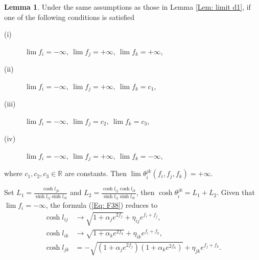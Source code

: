 \documentclass[12pt]{amsart}
\theoremstyle{definition}
\newtheorem{lemma}[theorem]{Lemma}
\begin{document}
\begin{lemma}\label{Lem: limit d3}
Under the same assumptions as those in Lemma \ref{Lem: limit d1},
if one of the following conditions is satisfied
\begin{description}
\item[(i)] $\lim f_i=-\infty,\ \lim f_j=+\infty,\ \lim f_k=+\infty$,
\item[(ii)] $\lim f_i=-\infty,\ \lim f_j=+\infty,\ \lim f_k=c_1$,
\item[(iii)] $\lim f_i=-\infty,\ \lim f_j=c_2,\ \lim f_k=c_3$,
\item[(iv)] $\lim f_i=-\infty,\ \lim f_j=+\infty,\ \lim f_k=-\infty$,
\end{description}
where $c_1,c_2,c_3\in \mathbb{R}$ are constants.
Then $\lim\theta^{jk}_i(f_i,f_j,f_k)=+\infty$.
\end{lemma}
\proof
Set $L_1=\frac{\cosh l_{jk}}{\sinh l_{ij}\sinh l_{ik}}$ and $L_2=\frac{\cosh l_{ij}\cosh l_{ik}}{\sinh l_{ij}\sinh l_{ik}}$, then $\cosh \theta^{jk}_i=L_1+L_2$.
Given that $\lim f_i=-\infty$, the formula (\ref{Eq: F38}) reduces to
\begin{equation}\label{Eq: F2}
\begin{aligned}
\cosh l_{ij}
&\rightarrow\sqrt{1+\alpha_je^{2f_j}}
+\eta_{ij}e^{f_i+f_j},\\
\cosh l_{ik}
&\rightarrow\sqrt{1+\alpha_ke^{2f_k}}
+\eta_{ik}e^{f_i+f_k},\\
\cosh l_{jk}
&=-\sqrt{(1+\alpha_je^{2f_j})(1+\alpha_ke^{2f_k})}
+\eta_{jk}e^{f_j+f_k}.
\end{aligned}
\end{equation}
\end{document}
